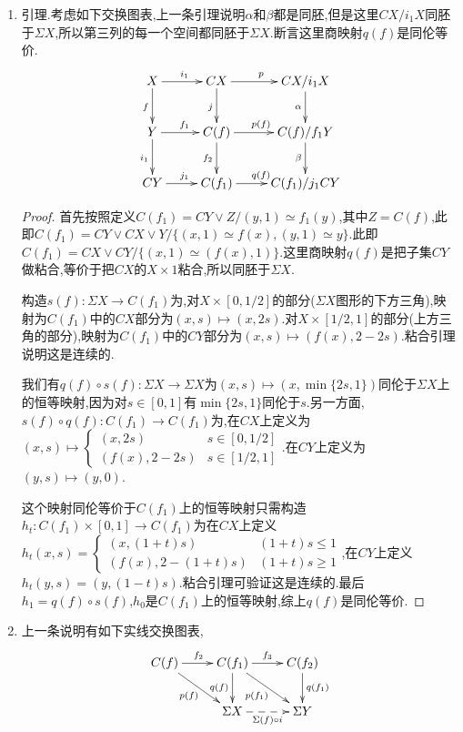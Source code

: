 \begin{enumerate}
\begin{proof}
		routine,验证$\overline{F}$是单射满射和开映射.
	\end{proof}
    \item 引理.考虑如下交换图表,上一条引理说明$\alpha$和$\beta$都是同胚,但是这里$CX/i_1X$同胚于$\Sigma X$,所以第三列的每一个空间都同胚于$\Sigma X$.断言这里商映射$q(f)$是同伦等价.
    $$\xymatrix{X\ar[r]^{i_1}\ar[d]_f&CX\ar[r]^p\ar[d]_j&CX/i_1X\ar[d]_{\alpha}\\Y\ar[r]^{f_1}\ar[d]_{i_1}&C(f)\ar[r]^{p(f)}\ar[d]_{f_2}&C(f)/f_1Y\ar[d]_{\beta}\\CY\ar[r]^{j_1}&C(f_1)\ar[r]^{q(f)}&C(f_1)/j_1CY}$$
    \begin{proof}
    	
    	首先按照定义$C(f_1)=CY\vee Z/(y,1)\simeq f_1(y)$,其中$Z=C(f)$,此即$C(f_1)=CY\vee CX\vee Y/\{(x,1)\simeq f(x),(y,1)\simeq y\}$.此即$C(f_1)=CX\vee CY/\{(x,1)\simeq(f(x),1)\}$.这里商映射$q(f)$是把子集$CY$做粘合,等价于把$CX$的$X\times{1}$粘合,所以同胚于$\Sigma X$.
    	
    	\qquad
    	
    	构造$s(f):\Sigma X\to C(f_1)$为,对$X\times[0,1/2]$的部分($\Sigma X$图形的下方三角),映射为$C(f_1)$中的$CX$部分为$(x,s)\mapsto(x,2s)$.对$X\times[1/2,1]$的部分(上方三角的部分),映射为$C(f_1)$中的$CY$部分为$(x,s)\mapsto(f(x),2-2s)$.粘合引理说明这是连续的.
    	
    	\qquad
    	
    	我们有$q(f)\circ s(f):\Sigma X\to\Sigma X$为$(x,s)\mapsto(x,\min\{2s,1\})$同伦于$\Sigma X$上的恒等映射,因为对$s\in[0,1]$有$\min\{2s,1\}$同伦于$s$.另一方面,$s(f)\circ q(f):C(f_1)\to C(f_1)$为,在$CX$上定义为$(x,s)\mapsto\left\{\begin{array}{cc}(x,2s)&s\in[0,1/2]\\(f(x),2-2s)&s\in[1/2,1]\end{array}\right.$.在$CY$上定义为$(y,s)\mapsto(y,0)$.
    	
    	\qquad
    	
    	这个映射同伦等价于$C(f_1)$上的恒等映射只需构造$h_t:C(f_1)\times[0,1]\to C(f_1)$为在$CX$上定义$h_t(x,s)=\left\{\begin{array}{cc}(x,(1+t)s)&(1+t)s\le1\\(f(x),2-(1+t)s)&(1+t)s\ge1\end{array}\right.$,在$CY$上定义$h_t(y,s)=(y,(1-t)s)$.粘合引理可验证这是连续的.最后$h_1=q(f)\circ s(f)$,$h_0$是$C(f_1)$上的恒等映射,综上$q(f)$是同伦等价.
    \end{proof}
    \item 上一条说明有如下实线交换图表,
    $$\xymatrix{C(f)\ar[r]^{f_2}\ar[dr]_{p(f)}&C(f_1)\ar[r]^{f_3}\ar[d]_{q(f)}\ar[dr]_{p(f_1)}&C(f_2)\ar[d]^{q(f_1)}\\&\Sigma X\ar@{-->}[r]_{\Sigma(f)\circ i}&\Sigma Y}$$
    

\end{enumerate}
